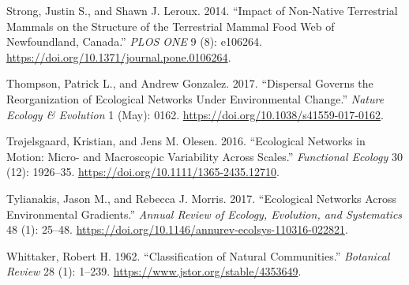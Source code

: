 \leavevmode\hypertarget{ref-StroLero14}{}%
Strong, Justin S., and Shawn J. Leroux. 2014. ``Impact of Non-Native
Terrestrial Mammals on the Structure of the Terrestrial Mammal Food Web
of Newfoundland, Canada.'' \emph{PLOS ONE} 9 (8): e106264.
\url{https://doi.org/10.1371/journal.pone.0106264}.

\leavevmode\hypertarget{ref-ThomGonz17}{}%
Thompson, Patrick L., and Andrew Gonzalez. 2017. ``Dispersal Governs the
Reorganization of Ecological Networks Under Environmental Change.''
\emph{Nature Ecology \& Evolution} 1 (May): 0162.
\url{https://doi.org/10.1038/s41559-017-0162}.

\leavevmode\hypertarget{ref-TrojOles16}{}%
Trøjelsgaard, Kristian, and Jens M. Olesen. 2016. ``Ecological Networks
in Motion: Micro- and Macroscopic Variability Across Scales.''
\emph{Functional Ecology} 30 (12): 1926--35.
\url{https://doi.org/10.1111/1365-2435.12710}.

\leavevmode\hypertarget{ref-TyliMorr17}{}%
Tylianakis, Jason M., and Rebecca J. Morris. 2017. ``Ecological Networks
Across Environmental Gradients.'' \emph{Annual Review of Ecology,
Evolution, and Systematics} 48 (1): 25--48.
\url{https://doi.org/10.1146/annurev-ecolsys-110316-022821}.

\leavevmode\hypertarget{ref-Whit62}{}%
Whittaker, Robert H. 1962. ``Classification of Natural Communities.''
\emph{Botanical Review} 28 (1): 1--239.
\url{https://www.jstor.org/stable/4353649}.
